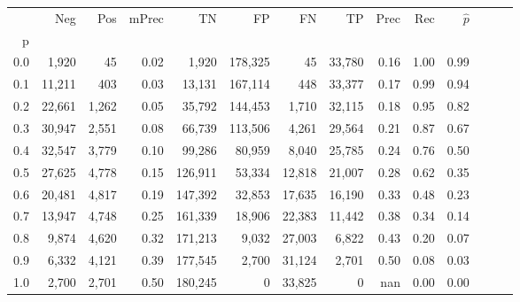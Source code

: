 \begin{tabular}{rrrrrrrrrrrrrr}
\toprule
{} &     Neg &    Pos & mPrec &       TN &       FP &      FN &      TP &  Prec &   Rec & $\hat{p}$ \\
p   &         &        &       &          &          &         &         &       &       &           \\
\midrule
0.0 &   1,920 &     45 &  0.02 &    1,920 &  178,325 &      45 &  33,780 &  0.16 &  1.00 &      0.99 \\
0.1 &  11,211 &    403 &  0.03 &   13,131 &  167,114 &     448 &  33,377 &  0.17 &  0.99 &      0.94 \\
0.2 &  22,661 &  1,262 &  0.05 &   35,792 &  144,453 &   1,710 &  32,115 &  0.18 &  0.95 &      0.82 \\
0.3 &  30,947 &  2,551 &  0.08 &   66,739 &  113,506 &   4,261 &  29,564 &  0.21 &  0.87 &      0.67 \\
0.4 &  32,547 &  3,779 &  0.10 &   99,286 &   80,959 &   8,040 &  25,785 &  0.24 &  0.76 &      0.50 \\
0.5 &  27,625 &  4,778 &  0.15 &  126,911 &   53,334 &  12,818 &  21,007 &  0.28 &  0.62 &      0.35 \\
0.6 &  20,481 &  4,817 &  0.19 &  147,392 &   32,853 &  17,635 &  16,190 &  0.33 &  0.48 &      0.23 \\
0.7 &  13,947 &  4,748 &  0.25 &  161,339 &   18,906 &  22,383 &  11,442 &  0.38 &  0.34 &      0.14 \\
0.8 &   9,874 &  4,620 &  0.32 &  171,213 &    9,032 &  27,003 &   6,822 &  0.43 &  0.20 &      0.07 \\
0.9 &   6,332 &  4,121 &  0.39 &  177,545 &    2,700 &  31,124 &   2,701 &  0.50 &  0.08 &      0.03 \\
1.0 &   2,700 &  2,701 &  0.50 &  180,245 &        0 &  33,825 &       0 &   nan &  0.00 &      0.00 \\
\bottomrule
\end{tabular}

